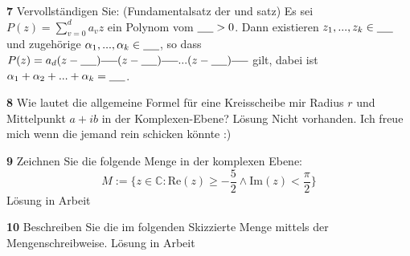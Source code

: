 \documentclass[11pt]{article}
\begin{document}
    \textbf{7} Vervollständigen Sie:
    (Fundamentalsatz der \underline{\hspace{2cm}} und \underline{\hspace{2cm}} satz) Es sei
    \( P(z) = \sum_{v=0}^{d} a_v z \)
    ein Polynom vom \( \underline{\hspace{0.5cm}} > 0 \). Dann existieren \( z_1, ..., z_k \in \underline{\hspace{0.5cm}} \) und zugehörige \( \alpha_1, ..., \alpha_k \in \underline{\hspace{0.5cm}} \), so dass
    \( P(z) = a_d (z-\underline{\hspace{0.5cm}})^{\underline{\hspace{0.5cm}}} (z-\underline{\hspace{0.5cm}})^{\underline{\hspace{0.5cm}}} ... (z-\underline{\hspace{0.5cm}})^{\underline{\hspace{0.5cm}}} \)
    gilt, dabei ist \( \alpha_1 + \alpha_2 + ... + \alpha_k = \underline{\hspace{0.5cm}} \).\newline

    \textbf{8} Wie lautet die allgemeine Formel für eine Kreisscheibe mir Radius $r$ und Mittelpunkt $a + ib$ in der Komplexen-Ebene?\newline
    Lösung Nicht vorhanden. Ich freue mich wenn die jemand rein schicken könnte :)\newline

    \textbf{9} Zeichnen Sie die folgende Menge in der komplexen Ebene:
    \[ M := \{ z \in \mathbb{C} : \text{Re}(z) \geq -\frac{5}{2} \land \text{Im}(z) < \frac{\pi}{2} \} \]\newline
    Lösung in Arbeit\newline

    \textbf{10} Beschreiben Sie die im folgenden Skizzierte Menge mittels der Mengenschreibweise.\newline
    Lösung in Arbeit\newline
\end{document}
